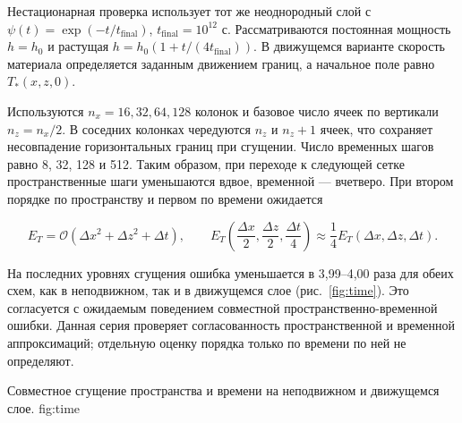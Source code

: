 


Нестационарная проверка использует тот же неоднородный слой
с $\psi(t)=\exp(-t/t_{\mathrm{final}})$,
$t_{\mathrm{final}}=10^{12}$ с. Рассматриваются постоянная
мощность $h=h_0$ и растущая
$h=h_0(1+t/(4t_{\mathrm{final}}))$.
В движущемся варианте скорость материала определяется заданным
движением границ, а начальное поле равно $T_*(x,z,0)$.

Используются $n_x=16,32,64,128$ колонок и базовое число ячеек
по вертикали $n_z=n_x/2$. В соседних колонках чередуются
$n_z$ и $n_z+1$ ячеек, что сохраняет несовпадение горизонтальных
границ при сгущении. Число временных шагов равно 8, 32, 128 и 512.
Таким образом, при переходе к следующей сетке пространственные
шаги уменьшаются вдвое, временной --- вчетверо.
При втором порядке по пространству и первом по времени ожидается

\begin{equation}
 E_T=\mathcal O(\Delta x^2+\Delta z^2+\Delta t),\qquad
 E_T\!\left(\frac{\Delta x}{2},\frac{\Delta z}{2},\frac{\Delta t}{4}\right)
 \approx\frac14E_T(\Delta x,\Delta z,\Delta t).
\end{equation}

На последних уровнях сгущения ошибка уменьшается в 3,99--4,00 раза
для обеих схем, как в неподвижном, так и в движущемся слое
(рис.~\ref{fig:time}). Это согласуется с ожидаемым поведением
совместной пространственно-временной ошибки.
Данная серия проверяет согласованность пространственной и временной
аппроксимаций; отдельную оценку порядка только по времени
по ней не определяют.

  {Совместное сгущение пространства и времени на неподвижном и движущемся слое.}
  {fig:time}

